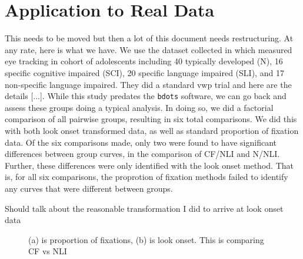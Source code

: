 \documentclass{article}
\newcommand{\xt}{\texttt}
\begin{document}
\section{Application to Real Data}


This needs to be moved but then a lot of this document needs restructuring. At any rate, here is what we have. We use the dataset collected in \cite{mcmurray2010individual} which measured eye tracking in cohort of adolescents including 40 typically developed (N), 16 specific cognitive impaired (SCI), 20 specific language impaired (SLI), and 17 non-specific language impaired. They did a standard vwp trial and here are the details [...]. While this study predates the \xt{bdots} software,  we can go back and assess these groups doing a typical analysis.  In doing so, we did a factorial comparison of all pairwise groups, resulting in six total comparisons. We did this with both look onset transformed data, as well as standard proportion of fixation data. Of the six comparisons made, only two were found to have significant differences between group curves, in the comparison of CF/NLI and N/NLI. Further, these differences were only identified with the look onset method. That is, for all six comparisons, the proprotion of fixation methods failed to identify any curves that were different between groups.

Should talk about the reasonable transformation I did to arrive at look onset data

\begin{figure}[H]
    \centering
    \caption{(a) is proportion of fixations, (b) is look onset. This is comparing CF vs NLI}
\label{fig:irldata1}
\end{figure}
\end{document}

